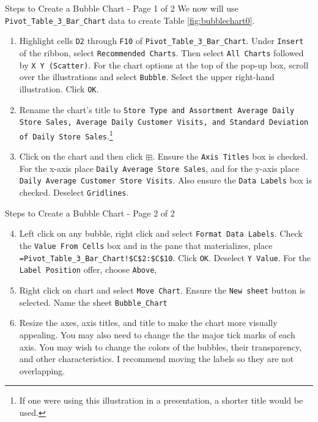 \documentclass[pdf]{beamer}
\theoremstyle{remark}
\theoremstyle{definition}
\begin{document}
\begin{frame}[t]{Steps to Create a Bubble Chart - Page 1 of 2}
  We now will use \texttt{Pivot\_Table\_3\_Bar\_Chart} data to create Table \ref{fig:bubblechart0}.
\vspace{-1.5ex}
\small
\begin{enumerate}
\item Highlight cells \texttt{D2} through \texttt{F10} of \texttt{Pivot\_Table\_3\_Bar\_Chart}.  Under  \texttt{Insert} of the ribbon, select  \texttt{Recommended Charts}.  Then select \texttt{All Charts} followed by  \texttt{X Y (Scatter)}. For the chart options at the top of the pop-up box, scroll over the illustrations and select \texttt{Bubble}.  Select the upper right-hand illustration. Click  \texttt{OK}.
\item Rename the chart's title to  \texttt{Store Type and Assortment Average Daily Store Sales, Average Daily Customer Visits, and Standard Deviation of Daily Store Sales}.\footnote{If one were using this illustration in a presentation, a shorter title would be used.}
\item Click on the chart and then click \texttt{$\boxplus$}. Ensure the \texttt{Axis Titles} box is checked.  For the x-axis place \texttt{Daily Average Store Sales},  and for the y-axis place \texttt{Daily Average Customer Store Visits}.  Also ensure the \texttt{Data Labels} box is checked.  Deselect \texttt{Gridlines}. 
\end{enumerate}
\end{frame}

\begin{frame}[t]{Steps to Create a Bubble Chart - Page 2 of 2}
\small
\begin{enumerate}
  \setcounter{enumi}{3}
\item Left click on any bubble, right click and select \texttt{Format Data Labels}.  Check the \texttt{Value From Cells} box and in the pane that materializes, place \texttt{=Pivot\_Table\_3\_Bar\_Chart!\$C\$2:\$C\$10}. Click \texttt{OK}. Deselect \texttt{Y Value}.  For the \texttt{Label Position} offer, choose \texttt{Above}, 
 \item Right click on chart and select \texttt{Move Chart}.  Ensure the \texttt{New sheet} button is selected. Name the sheet \texttt{Bubble\_Chart}
\item  Resize the axes, axis titles, and title to make the chart more visually appealing.  You may also need to change the the major tick marks of each axis.  You may wish to change the colors of the bubbles, their transparency, and other characteristics.  I recommend moving the labels so they are not overlapping.
\end{enumerate}
\end{frame}
\end{document}
